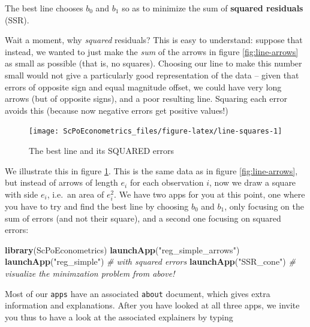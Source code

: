 \documentclass[]{book}
\newenvironment{Shaded}{\begin{snugshade}}{\end{snugshade}}
\newcommand{\KeywordTok}[1]{\textcolor[rgb]{0.13,0.29,0.53}{\textbf{#1}}}
\newcommand{\StringTok}[1]{\textcolor[rgb]{0.31,0.60,0.02}{#1}}
\newcommand{\CommentTok}[1]{\textcolor[rgb]{0.56,0.35,0.01}{\textit{#1}}}
\newcommand{\NormalTok}[1]{#1}
\newenvironment{warning}{\begin{tcolorbox}[colback=orange!5!white,colframe=orange,title=\textbf{Warning!}]}{\end{tcolorbox}}
\theoremstyle{definition}
\theoremstyle{definition}
\theoremstyle{definition}
\theoremstyle{remark}
\begin{document}
\begin{warning}
The best line chooses \(b_0\) and \(b_1\) so as to minimize the sum of
\textbf{squared residuals} (SSR).
\end{warning}

 Wait a moment, why \emph{squared} residuals? This is easy to
understand: suppose that instead, we wanted to just make the \emph{sum}
of the arrows in figure \ref{fig:line-arrows} as small as possible (that
is, no squares). Choosing our line to make this number small would not
give a particularly good representation of the data -- given that errors
of opposite sign and equal magnitude offset, we could have very long
arrows (but of opposite signs), and a poor resulting line. Squaring each
error avoids this (because now negative errors get positive values!)

\begin{figure}

{\centering \texttt{[image: ScPoEconometrics\_files/figure-latex/line-squares-1]} 

}

\caption{The best line and its SQUARED errors}\label{fig:line-squares}
\end{figure}

We illustrate this in figure \ref{fig:line-squares}. This is the same
data as in figure \ref{fig:line-arrows}, but instead of arrows of length
\(e_i\) for each observation \(i\), now we draw a square with side
\(e_i\), i.e.~an area of \(e_i^2\). We have two apps for you at this
point, one where you have to try and find the best line by choosing
\(b_0\) and \(b_1\), only focusing on the sum of errors (and not their
square), and a second one focusing on squared errors:

\begin{Shaded}
\begin{Highlighting}[]
\KeywordTok{library}\NormalTok{(ScPoEconometrics)}
\KeywordTok{launchApp}\NormalTok{(}\StringTok{"reg_simple_arrows"}\NormalTok{)}
\KeywordTok{launchApp}\NormalTok{(}\StringTok{"reg_simple"}\NormalTok{) }\CommentTok{# with squared errors}
\KeywordTok{launchApp}\NormalTok{(}\StringTok{"SSR_cone"}\NormalTok{) }\CommentTok{# visualize the minimzation problem from above!}
\end{Highlighting}
\end{Shaded}

Most of our \texttt{apps} have an associated \texttt{about} document,
which gives extra information and explanations. After you have looked at
all three apps, we invite you thus to have a look at the associated
explainers by typing
\end{document}
